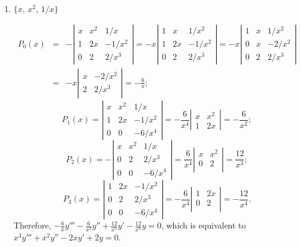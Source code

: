 \documentclass{ximera}
\begin{document}
\begin{problem}
\begin{enumerate}
 \item $\{x,\,x^2,\,1/x\}$

\begin{solution}
\begin{eqnarray*}
P_0(x)&=&
-\left|\begin{array}{ccc}
x&x^2&1/x\\
1&2x&-1/x^2\\
0&2&2/x^3
\end{array}\right|=
-x\left|\begin{array}{ccr}
1&x&1/x^2\\
1&2x&-1/x^2\\
0&2&2/x^3
\end{array}\right|=
-x\left|\begin{array}{ccr}
1&x&1/x^2\\
0&x&-2/x^2\\
0&2&2/x^3
\end{array}\right|\\
&=&-x\left|\begin{array}{cr}
x&-2/x^2\\
2&2/x^3
\end{array}\right|=-\frac{6}{x};
\end{eqnarray*}
$$
P_1(x)=
\left|\begin{array}{ccc}
x&x^2&1/x\\
1&2x&-1/x^2\\
0&0&-6/x^4
\end{array}\right|=
-\frac{6}{x^4}\left|\begin{array}{ccc}
x&x^2\\
1&2x
\end{array}\right|=-\frac{6}{x^2};
$$
$$
P_2(x)=
-\left|\begin{array}{ccc}
x&x^2&1/x\\
0&2&2/x^3\\
0&0&-6/x^4
\end{array}\right|=
\frac{6}{x^4}\left|\begin{array}{ccc}
x&x^2\\
0&2\\
\end{array}\right|=\frac{12}{x^3};
$$
$$
P_3(x)=
\left|\begin{array}{ccc}
1&2x&-1/x^2\\
0&2&2/x^3\\
0&0&-6/x^4
\end{array}\right|=
-\frac{6}{x^4}\left|\begin{array}{ccc}
1&2x\\
0&2\\
\end{array}\right|=-\frac{12}{x^4}.
$$
Therefore,
$-\frac{6}{x}y'''-\frac{6}{x^2}y''+\frac{12}{x^3}y'-\frac{12}{x^4}y=0$,
which is equivalent to $x^3y'''+x^2y''-2xy'+2y=0$.
\end{solution}
 

\end{enumerate}
\end{problem}
\end{document}
